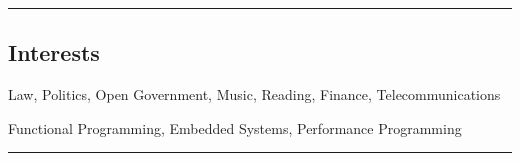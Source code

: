\documentclass[10pt,letterpaper]{article}
\begin{document}
\begin{itemize}

  \end{itemize}



\hrule
\vspace{-0.4em}
\subsection*{Interests}
\begin{description}[labelindent=\parindent]
  \item[Personal:]
  Law, Politics, Open Government, Music, Reading, Finance, Telecommunications
  \item[Technical:]
  Functional Programming, Embedded Systems, Performance Programming
\end{description}

\hrule
\vspace{-0.4em}
\end{document}
